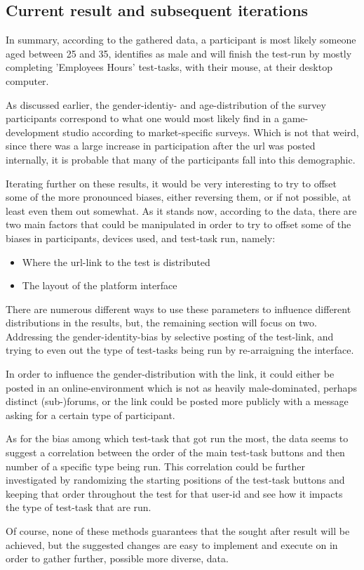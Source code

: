   \subsection{Current result and subsequent iterations}

  In summary, according to the gathered data, a participant is most likely
  someone aged between 25 and 35, identifies as male and will finish the
  test-run by mostly completing 'Employees Hours' test-tasks, with their mouse,
  at their desktop computer.

  As discussed earlier, the gender-identiy- and age-distribution of the
  survey participants correspond to what one would most likely find in a
  game-development studio according to market-specific
  surveys\cite{citeIndex2019}. Which is not that weird, since there was a large
  increase in participation after the url was posted internally, it is probable
  that many of the participants fall into this demographic.

  Iterating further on these results, it would be
  very interesting to try to offset some of the more pronounced biases, either
  reversing them, or if not possible, at least even them out somewhat.
  As it stands now, according to the data, there are two main factors that
  could be manipulated in order to try to offset some of the biases in
  participants, devices used, and test-task run, namely:

  \begin{itemize}
    \item{Where the url-link to the test is distributed}
    \item{The layout of the platform interface}
  \end{itemize}

  There are numerous different ways to use these parameters to influence
  different distributions in the results, but, the remaining section will focus
  on two. Addressing the gender-identity-bias by selective posting of the test-link,
  and trying to even out the type of test-tasks being run by re-arraigning the
  interface.

  In order to influence the gender-distribution with the link, it could
  either be posted in an online-environment which is not as heavily
  male-dominated, perhaps distinct (sub-)forums, or the link could be posted
  more publicly with a message asking for a certain type of participant.

  As for the bias among which test-task that got run the most, the data seems
  to suggest a correlation between the order of the main test-task buttons and
  then number of a specific type being run. This correlation could be further
  investigated by randomizing the starting positions of the test-task buttons
  and keeping that order throughout the test for that user-id and see how it
  impacts the type of test-task that are run.

  Of course, none of these methods guarantees that the sought after result will
  be achieved, but the suggested changes are easy to implement and execute on
  in order to gather further, possible more diverse, data.


